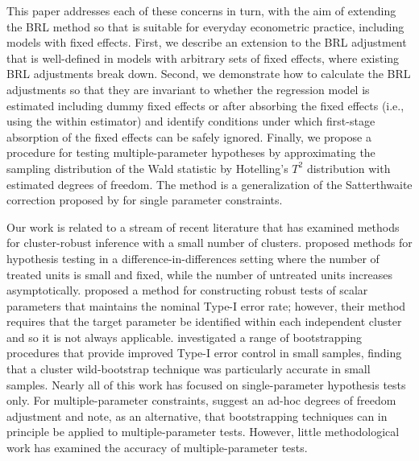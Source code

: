\documentclass[draft]{ectaart}\usepackage[]{graphicx}\usepackage[]{color}
\begin{document}
This paper addresses each of these concerns in turn, with the aim of extending the BRL method so that is suitable for everyday econometric practice, including models with fixed effects. 
First, we describe an extension to the BRL adjustment that is well-defined in models with arbitrary sets of fixed effects, where existing BRL adjustments break down. 
Second, we demonstrate how to calculate the BRL adjustments so that they are invariant to whether the regression model is estimated including dummy fixed effects or after absorbing the fixed effects (i.e., using the within estimator) and identify conditions under which first-stage absorption of the fixed effects can be safely ignored. 
Finally, we propose a procedure for testing multiple-parameter hypotheses by approximating the sampling distribution of the Wald statistic by Hotelling's $T^2$ distribution with estimated degrees of freedom. The method is a generalization of the Satterthwaite correction proposed by \citet{Bell2002bias} for single parameter constraints.

Our work is related to a stream of recent literature that has examined methods for cluster-robust inference with a small number of clusters. 
\citet{Conley2011inference} proposed methods for hypothesis testing in a difference-in-differences setting where the number of treated units is small and fixed, while the number of untreated units increases asymptotically. 
\citet{Ibragimov2010tstatistic} proposed a method for constructing robust tests of scalar parameters that maintains the nominal Type-I error rate; however, their method requires that the target parameter be identified within each independent cluster and so it is not always applicable.  
\citet{Cameron2008bootstrap} investigated a range of bootstrapping procedures that provide improved Type-I error control in small samples, finding that a cluster wild-bootstrap technique was particularly accurate in small samples. 
Nearly all of this work has focused on single-parameter hypothesis tests only. 
For multiple-parameter constraints, \citet{Cameron2015practitioners} suggest an ad-hoc degrees of freedom adjustment and note, as an alternative, that bootstrapping techniques can in principle be applied to multiple-parameter tests. 
However, little methodological work has examined the accuracy of multiple-parameter tests.
\end{document}
